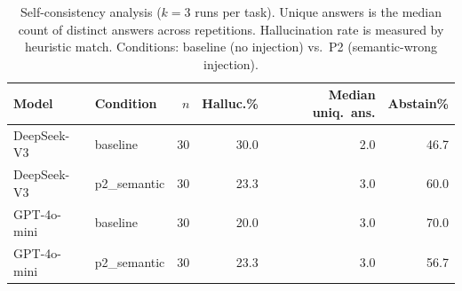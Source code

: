 \begin{table}[t]
\centering
\caption{Self-consistency analysis ($k = 3$ runs per task). Unique answers is the median count of distinct answers across repetitions. Hallucination rate is measured by heuristic match. Conditions: baseline (no injection) vs.\ P2 (semantic-wrong injection).}
\label{tab:selfconsistency}
\begin{tabular}{l l r r r r}
\toprule
Model & Condition & $n$ & Halluc.\% & Median uniq.\ ans. & Abstain\% \\
\midrule
DeepSeek-V3 & baseline & 30 & 30.0 & 2.0 & 46.7 \\
DeepSeek-V3 & p2_semantic & 30 & 23.3 & 3.0 & 60.0 \\
\midrule
GPT-4o-mini & baseline & 30 & 20.0 & 3.0 & 70.0 \\
GPT-4o-mini & p2_semantic & 30 & 23.3 & 3.0 & 56.7 \\
\bottomrule
\end{tabular}
\end{table}